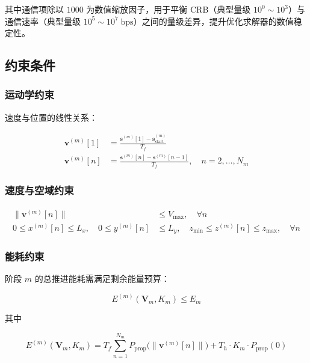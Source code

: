 其中通信项除以 $1000$ 为数值缩放因子，用于平衡 CRB（典型量级 $10^0\sim 10^3$）与通信速率（典型量级 $10^5\sim 10^7\;\mathrm{bps}$）之间的量级差异，提升优化求解器的数值稳定性。

\subsection{约束条件}

\subsubsection{运动学约束}

速度与位置的线性关系：

\begin{align}
\mathbf{v}^{(m)}[1]&=\frac{\mathbf{s}^{(m)}[1]-\mathbf{s}_{\mathrm{start}}^{(m)}}{T_f}
\label{eq:kin1}\\
\mathbf{v}^{(m)}[n]&=\frac{\mathbf{s}^{(m)}[n]-\mathbf{s}^{(m)}[n-1]}{T_f},\quad n=2,\ldots,N_m
\label{eq:kin2}
\end{align}

\subsubsection{速度与空域约束}

\begin{align}
\|\mathbf{v}^{(m)}[n]\|&\leq V_{\max},\quad \forall n \label{eq:speed}\\
0\leq x^{(m)}[n]\leq L_x,\quad 0\leq y^{(m)}[n]&\leq L_y,\quad z_{\min}\leq z^{(m)}[n]\leq z_{\max},\quad \forall n \label{eq:airspace}
\end{align}

\subsubsection{能耗约束}

阶段 $m$ 的总推进能耗需满足剩余能量预算：

\begin{equation}
E^{(m)}(\mathbf{V}_m,K_m)\leq E_m
\label{eq:energy_p2m}
\end{equation}

其中

\begin{equation}
E^{(m)}(\mathbf{V}_m,K_m)=T_f\sum_{n=1}^{N_m}P_{\mathrm{prop}}\bigl(\|\mathbf{v}^{(m)}[n]\|\bigr)+T_h\cdot K_m\cdot P_{\mathrm{prop}}(0)
\label{eq:energy_breakdown}
\end{equation}

